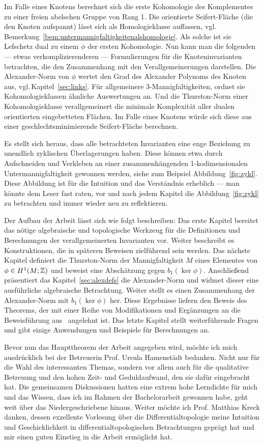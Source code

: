     Im Falle eines Knotens berechnet sich die erste Kohomologie des Komplementes zu einer freien abelschen Gruppe von Rang 1. Die orientierte Seifert-Fläche (die den Knoten aufspannt) lässt sich als Homologieklasse auffassen, vgl.\,Bemerkung~\ref{bem:untermannigfaltigkeitenalshomologie}. Als solche ist sie Lefschetz dual zu einem $\phi$ der ersten Kohomologie. Nun kann man die folgenden --- etwas verkomplizierenderen --- Formulierungen für die Knoteninvarianten betrachten, die den Zusammenhang mit den Verallgemeinerungen darstellen. Die Alexander-Norm von $\phi$ wertet den Grad des Alexander Polynoms des Knoten aus, vgl.\,Kapitel~\ref{sec:links}. Für allgemeinere 3-Mannigfaltigkeiten, ordnet sie Kohomologieklassen ähnliche Auswertungen an. Und die Thurston-Norm einer Kohomologieklasse verallgemeinert die minimale Komplexität aller dualen orientierten eingebetteten Flächen. Im Falle eines Knotens würde sich diese aus einer geschlechtsminimierende Seifert-Fläche berechnen.

    Es stellt sich heraus, dass alle betrachteten Invarianten eine enge Beziehung zu unendlich zyklischen Überlagerungen haben. Diese können etwa durch Aufschneiden und Verkleben an einer zusammenhängenden 1-kodimensionalen Untermannigfaltigkeit gewonnen werden, siehe zum Beipsiel Abbildung~\ref{fig:zykl}. Diese Abbildung ist für die Intuition und das Verständnis erheblich --- man könnte dem Leser fast raten, vor und nach jedem Kapitel die Abbildung~\ref{fig:zykl} zu betrachten und immer wieder neu zu reflektieren.

    Der Aufbau der Arbeit lässt sich wie folgt beschreiben: Das erste Kapitel bereitet das nötige algebraische und topologische Werkzeug für die Definitionen und Berechnungen der verallgemeinerten Invarianten vor. Weiter beschreibt es Konstruktionen, die in späteren Beweisen zielführend sein werden. Das nächste Kapitel definiert die Thurston-Norm der Mannigfaltigkeit $M$ eines Elementes von $\phi \in H^1(M;\mathbb{Z})$ und beweist eine Abschätzung gegen $b_1(\ker\phi)$. Anschließend präsentiert das Kapitel~\ref{sec:alexdefs} die Alexander-Norm und widmet dieser eine ausführliche algebraische Betrachtung. Weiter stellt es einen Zusammenhang der Alexander-Norm mit $b_1(\ker\phi)$ her. Diese Ergebnisse liefern den Beweis des Theorems, der mit einer Reihe von Modifikationen und Ergänzungen an die Beweisführung aus~\cite{MCMULLEN.2002} angelehnt ist. Das letzte Kapitel stellt weiterführende Fragen und gibt einige Anwendungen und Beispiele für Berechnungen an.   

    Bevor nun das Haupttheorem der Arbeit angegeben wird, möchte ich mich ausdrücklich bei der Betreuerin Prof. Ursula Hamenstädt bedanken. Nicht nur für die Wahl des interessanten Themas, sondern vor allem auch für die qualitative Betreuung und den hohen Zeit- und Geduldaufwand, den sie dafür eingebracht hat. Die gemeinsamen Diskussionen hatten eine extrem hohe Lerndichte für mich und das Wissen, dass ich im Rahmen der Bachelorarbeit gewonnen habe, geht weit über das Niedergeschriebene hinaus. Weiter möchte ich Prof. Matthias Kreck danken, dessen exzellente Vorlesung über die Differentialtopologie meine Intuition und Geschicklichkeit in differentialtopologischen Betrachtungen geprägt hat und mir einen guten Einstieg in die Arbeit ermöglicht hat.

